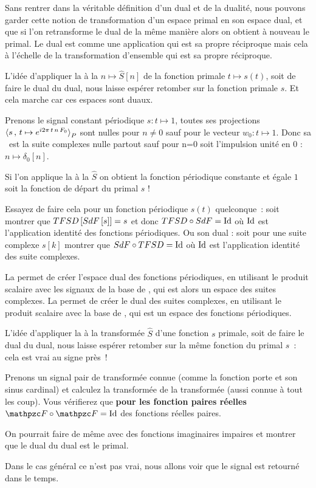 Sans rentrer dans la véritable définition d'un dual et de la dualité,
nous pouvons garder cette notion de transformation d'un espace primal
en son espace dual, et que si l'on retransforme le dual de la même
manière alors on obtient à nouveau le primal. Le dual est comme une
application qui est sa propre réciproque mais cela à l'échelle de la
transformation d'ensemble qui est sa propre réciproque.

L'idée d'appliquer la \TFSD{} à la \sdf{} $n\mapsto \hat{S}[n]$ de la
fonction primale $t\mapsto s(t)$, soit de faire le dual du dual, nous
laisse espérer retomber sur la fonction primale $s$. Et cela marche
car ces espaces sont duaux.

\begin{exercice}
  Prenons le signal constant périodique $s : t\mapsto 1$, toutes ses
  projections $\langle s\,,\,t\mapsto e^{i2\pi\,t\,n\,F_0}{\rangle}_P$ sont nulles
  pour $n\neq0$ sauf pour le vecteur $w_0 : t\mapsto 1$. Donc sa
  \sdf{} est la suite complexes nulle partout sauf pour n=0 soit
  l'impulsion unité en 0 : $n\mapsto\delta_0[n]$.

  Si l'on applique la \TFSD{} à la \sdf{} $\hat{S}$ on obtient la
  fonction périodique constante et égale $1$ soit la fonction de
  départ du primal $s$ !

  Essayez de faire cela pour un fonction périodique $s(t)$
  quelconque~: soit montrer que $TFSD{}\left[SdF{}\left[s\right]\right]=s$ et donc
  $TFSD{} \circ SdF{} = \mathrm{Id}$ où $\mathrm{Id}$ est l'application identité des
  fonctions périodiques.  Ou son dual : soit pour une suite complexe
  $s[k]$ montrer que $SdF \circ TFSD = \mathrm{Id}$ où $\mathrm{Id}$ est
  l'application identité des suite complexes.
  
\end{exercice}


La \sdf{} permet de créer l'espace dual des fonctions périodiques, en
utilisant le produit scalaire avec les signaux de la base de \Fourier,
qui est alors un espace des suites complexes. La \TFSD{} permet de
créer le dual des suites complexes, en utilisant le produit scalaire
avec la base de \Fourier{}, qui est un espace des fonctions
périodiques.

L'idée d'appliquer la \TF{} à la transformée $\hat{S}$ d'une fonction
$s$ primale, soit de faire le dual du dual, nous laisse espérer
retomber sur la même fonction du primal $s$~: cela est vrai au signe
près~!


\begin{exercice}
  Prenons un signal pair de transformée connue (comme la fonction
  porte et son sinus cardinal) et calculez la transformée de la
  transformée (aussi connue à tout les coup). Vous vérifierez que
  \textbf{pour les fonction paires réelles} $\F{}\circ\F{}=\Id$ des
  fonctions réelles paires.

  On pourrait faire de même avec des fonctions imaginaires impaires et
  montrer que le dual du dual est le primal.

  Dans le cas général ce n'est pas vrai, nous allons voir que le
  signal est retourné dans le temps.
  
\end{exercice}

